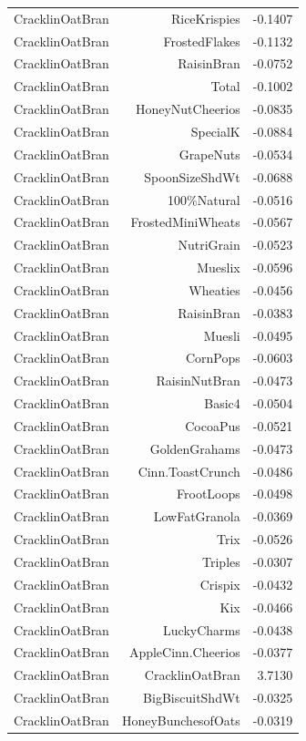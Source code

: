 \begin{longtable}{@{}lrr@{}}
CracklinOatBran & RiceKrispies & -0.1407 \\
CracklinOatBran & FrostedFlakes & -0.1132 \\
CracklinOatBran & RaisinBran & -0.0752 \\
CracklinOatBran & Total & -0.1002 \\
CracklinOatBran & HoneyNutCheerios & -0.0835 \\
CracklinOatBran & SpecialK & -0.0884 \\
CracklinOatBran & GrapeNuts & -0.0534 \\
CracklinOatBran & SpoonSizeShdWt & -0.0688 \\
CracklinOatBran & 100\%Natural & -0.0516 \\
CracklinOatBran & FrostedMiniWheats & -0.0567 \\
CracklinOatBran & NutriGrain & -0.0523 \\
CracklinOatBran & Mueslix & -0.0596 \\
CracklinOatBran & Wheaties & -0.0456 \\
CracklinOatBran & RaisinBran & -0.0383 \\
CracklinOatBran & Muesli & -0.0495 \\
CracklinOatBran & CornPops & -0.0603 \\
CracklinOatBran & RaisinNutBran & -0.0473 \\
CracklinOatBran & Basic4 & -0.0504 \\
CracklinOatBran & CocoaPus & -0.0521 \\
CracklinOatBran & GoldenGrahams & -0.0473 \\
CracklinOatBran & Cinn.ToastCrunch & -0.0486 \\
CracklinOatBran & FrootLoops & -0.0498 \\
CracklinOatBran & LowFatGranola & -0.0369 \\
CracklinOatBran & Trix & -0.0526 \\
CracklinOatBran & Triples & -0.0307 \\
CracklinOatBran & Crispix & -0.0432 \\
CracklinOatBran & Kix & -0.0466 \\
CracklinOatBran & LuckyCharms & -0.0438 \\
CracklinOatBran & AppleCinn.Cheerios & -0.0377 \\
CracklinOatBran & CracklinOatBran & 3.7130 \\
CracklinOatBran & BigBiscuitShdWt & -0.0325 \\
CracklinOatBran & HoneyBunchesofOats & -0.0319 \\

\end{longtable}
